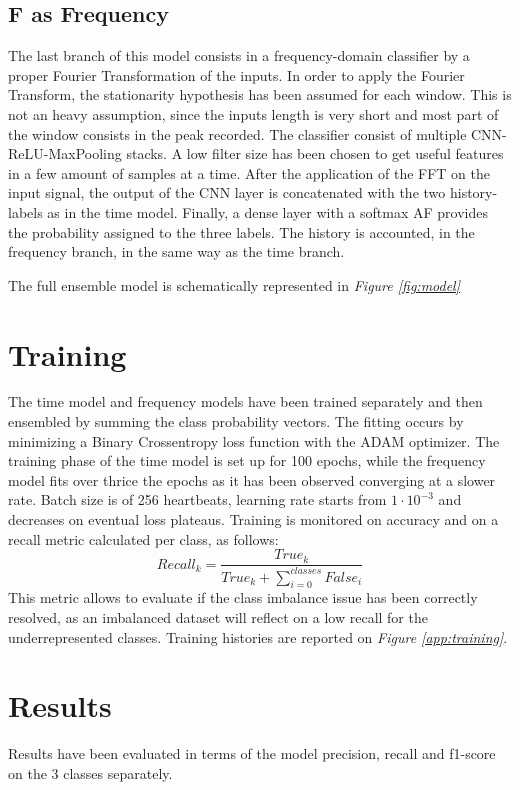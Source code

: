 \documentclass[conference]{IEEEtran}
\newcommand{\fig}[1]{\textit{Figure \ref{#1}}}
\begin{document}
\subsection{F as Frequency}
    The last branch of this model consists in a frequency-domain
    classifier by a proper Fourier Transformation of the inputs. In order
    to apply the Fourier Transform, the stationarity hypothesis has been
    assumed for each window. This is not an heavy assumption, since the
    inputs length is very short and most part of the window consists in
    the peak recorded. The classifier consist of multiple
    CNN-ReLU-MaxPooling stacks. A low filter size has been chosen to get
    useful features in a few amount of samples at a time. After the
    application of the FFT on the input signal, the output of the CNN
    layer is concatenated with the two history-labels as in the time
    model. Finally, a dense layer with a softmax AF provides the
    probability assigned to the three labels. The history is accounted, in the
    frequency branch, in the same way as the time branch.

    The full ensemble model is schematically represented in \fig{fig:model}

\section{Training}
    The time model and frequency models have been trained separately and then
    ensembled by summing the class probability vectors. The fitting occurs by
    minimizing a Binary Crossentropy loss function with the ADAM optimizer.
    The training phase of
    the time model is set up for 100 epochs, while the frequency model fits over
    thrice the epochs as it has been observed converging at a slower rate. Batch size is
    of 256 heartbeats, learning rate starts from $1\cdot10^{-3}$ and
    decreases on eventual loss plateaus. Training is monitored on accuracy and
    on a recall metric calculated per class, as follows:
    \begin{equation}
        Recall_k=\frac{True_k}{True_k+\sum_{i=0}^{classes}False_i}
    \end{equation}
    This metric allows to evaluate if the class imbalance issue has been
    correctly resolved, as an imbalanced dataset will reflect on a low recall
    for the underrepresented classes.
    Training histories are reported on \fig{app:training}.

\section{Results}
    Results have been evaluated in terms of the model precision, recall and
    f1-score on the 3 classes separately.
    
\end{document}

